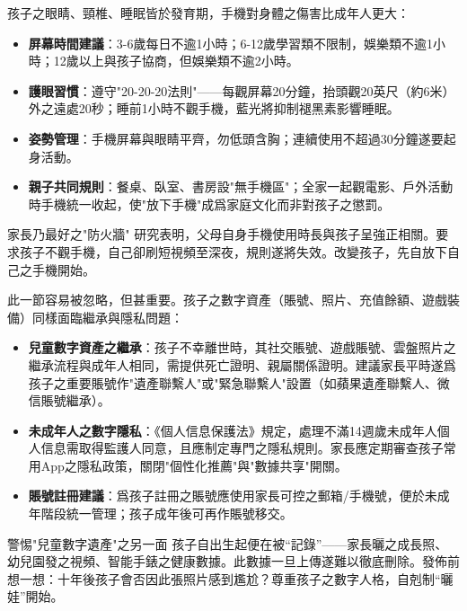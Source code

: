 
孩子之眼睛、頸椎、睡眠皆於發育期，手機對身體之傷害比成年人更大：

\begin{itemize}
  \item \textbf{屏幕時間建議}：3-6歲每日不逾1小時；6-12歲學習類不限制，娛樂類不逾1小時；12歲以上與孩子協商，但娛樂類不逾2小時。
  \item \textbf{護眼習慣}：遵守"20-20-20法則"——每觀屏幕20分鐘，抬頭觀20英尺（約6米）外之遠處20秒；睡前1小時不觀手機，藍光將抑制褪黑素影響睡眠。
  \item \textbf{姿勢管理}：手機屏幕與眼睛平齊，勿低頭含胸；連續使用不超過30分鐘遂要起身活動。
  \item \textbf{親子共同規則}：餐桌、臥室、書房設"無手機區"；全家一起觀電影、戶外活動時手機統一收起，使"放下手機"成爲家庭文化而非對孩子之懲罰。
\end{itemize}

\begin{tcbinfo}{家長乃最好之"防火牆"}
研究表明，父母自身手機使用時長與孩子呈強正相關。要求孩子不觀手機，自己卻刷短視頻至深夜，規則遂將失效。改變孩子，先自放下自己之手機開始。

\end{tcbinfo}


此一節容易被忽略，但甚重要。孩子之數字資產（賬號、照片、充值餘額、遊戲裝備）同樣面臨繼承與隱私問題：

\begin{itemize}
  \item \textbf{兒童數字資產之繼承}：孩子不幸離世時，其社交賬號、遊戲賬號、雲盤照片之繼承流程與成年人相同，需提供死亡證明、親屬關係證明。建議家長平時遂爲孩子之重要賬號作"遺產聯繫人"或"緊急聯繫人"設置（如蘋果遺產聯繫人、微信賬號繼承）。
  \item \textbf{未成年人之數字隱私}：《個人信息保護法》規定，處理不滿14週歲未成年人個人信息需取得監護人同意，且應制定專門之隱私規則。家長應定期審查孩子常用App之隱私政策，關閉"個性化推薦"與"數據共享"開關。
  \item \textbf{賬號註冊建議}：爲孩子註冊之賬號應使用家長可控之郵箱/手機號，便於未成年階段統一管理；孩子成年後可再作賬號移交。
\end{itemize}

\begin{tcbwarn}{警惕"兒童數字遺產"之另一面}
孩子自出生起便在被“記錄”——家長曬之成長照、幼兒園發之視頻、智能手錶之健康數據。此數據一旦上傳遂難以徹底刪除。發佈前想一想：十年後孩子會否因此張照片感到尷尬？尊重孩子之數字人格，自剋制“曬娃”開始。

\end{tcbwarn}

